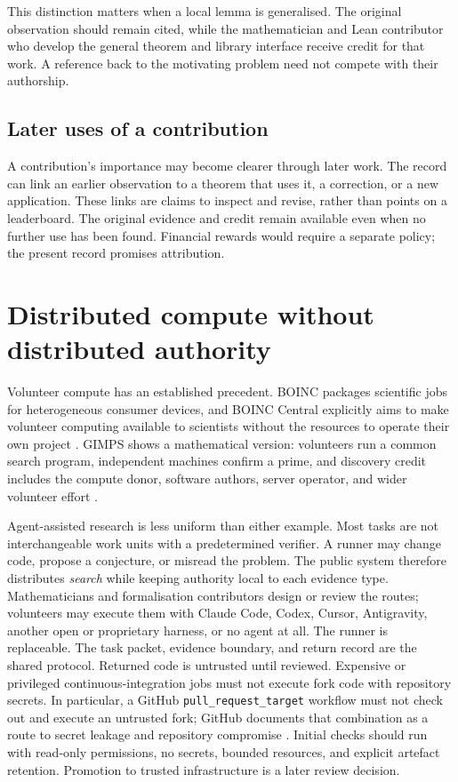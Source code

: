 \documentclass[10pt]{article}
\begin{document}
This distinction matters when a local lemma is generalised. The original
observation should remain cited, while the mathematician and Lean contributor
who develop the general theorem and library interface receive credit for that
work. A reference back to the motivating problem need not compete with their
authorship.

\subsection*{Later uses of a contribution}

A contribution's importance may become clearer through later work. The record
can link an earlier observation to a theorem that uses it, a correction, or a
new application. These links are claims to inspect and revise, rather than
points on a leaderboard. The original evidence and credit remain available
even when no further use has been found. Financial rewards would require a
separate policy; the present record promises attribution.

\section{Distributed compute without distributed authority}\label{sec:security}

Volunteer compute has an established precedent.  BOINC packages scientific
jobs for heterogeneous consumer devices, and BOINC Central explicitly aims to
make volunteer computing available to scientists without the resources to
operate their own project \cite{boinc}.  GIMPS shows a mathematical version:
volunteers run a common search program, independent machines confirm a prime,
and discovery credit includes the compute donor, software authors, server
operator, and wider volunteer effort \cite{gimps}.

Agent-assisted research is less uniform than either example.  Most tasks are
not interchangeable work units with a predetermined verifier.  A runner may
change code, propose a conjecture, or misread the problem.  The public system
therefore distributes \emph{search} while keeping authority local to each
evidence type.  Mathematicians and formalisation contributors design or review
the routes; volunteers may execute them with Claude Code, Codex, Cursor,
Antigravity, another open or proprietary harness, or no agent at all.  The
runner is replaceable.  The task packet, evidence boundary, and return record
are the shared protocol.  Returned code is untrusted until reviewed.  Expensive or
privileged continuous-integration jobs must not execute fork code with
repository secrets.  In particular, a GitHub \texttt{pull\_request\_target}
workflow must not check out and execute an untrusted fork; GitHub documents
that combination as a route to secret leakage and repository compromise
\cite{githubsecurity}.  Initial checks should run with read-only permissions,
no secrets, bounded resources, and explicit artefact retention.  Promotion to
trusted infrastructure is a later review decision.
\end{document}

